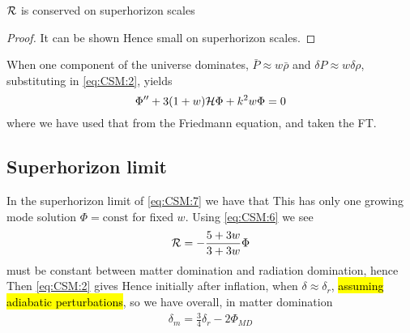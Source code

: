 \documentclass{article}
\begin{document}
\begin{prop}
$\mathcal{R}$ is conserved on superhorizon scales
\end{prop}
\begin{proof}
It can be shown 
Hence 
small on superhorizon scales. 
\end{proof}

When one component of the universe dominates, $\bar{P} \approx w \bar{\rho} $ and $\delta P \approx w \delta \rho$, substituting in \ref{eq:CSM:2}, yields 
\begin{equation}\label{eq:CSM:7}
\Phi^{\prime \prime} + 3(1+w) \mathcal{H} \Phi + k^2 w \Phi = 0
\end{equation}
where we have used that 
from the Friedmann equation, and taken the FT. 

\subsection{Superhorizon limit}
In the superhorizon limit of \ref{eq:CSM:7} we have that 
This has only one growing mode solution $\Phi = \text{const}$ for fixed $w$. Using \ref{eq:CSM:6} we see 
\begin{align} \label{eq:CSM:10}
\mathcal{R} = - \frac{5+3w}{3+3w} \Phi
\end{align}
must be constant between matter domination and radiation domination, hence 
Then \ref{eq:CSM:2} gives 
Hence initially after inflation, when $\delta \approx \delta_r$, \hl{assuming adiabatic perturbations}, 
so we have overall, in matter domination \begin{align}\label{eq:CSM:12}
    \delta_m = \frac{3}{4} \delta_r - 2\Phi_{MD}
\end{align}
\end{document}
